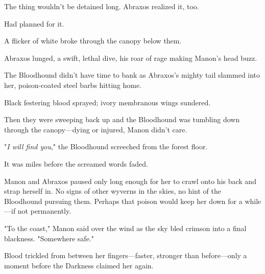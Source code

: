 The thing wouldn't be detained long. Abraxos realized it, too.

Had planned for it.

A flicker of white broke through the canopy below them.

Abraxos lunged, a swift, lethal dive, his roar of rage making Manon's head buzz.

The Bloodhound didn't have time to bank as Abraxos's mighty tail slammed into her, poison-coated steel barbs hitting home.

Black festering blood sprayed; ivory membranous wings sundered.

Then they were sweeping back up and the Bloodhound was tumbling down through the canopy---dying or injured, Manon didn't care.

"\emph{I will find you}," the Bloodhound screeched from the forest floor.

It was miles before the screamed words faded.

Manon and Abraxos paused only long enough for her to crawl onto his back and strap herself in. No signs of other wyverns in the skies, no hint of the Bloodhound pursuing them. Perhaps that poison would keep her down for a while---if not permanently.

"To the coast," Manon said over the wind as the sky bled crimson into a final blackness. "Somewhere safe."

Blood trickled from between her fingers---faster, stronger than before---only a moment before the Darkness claimed her again.
